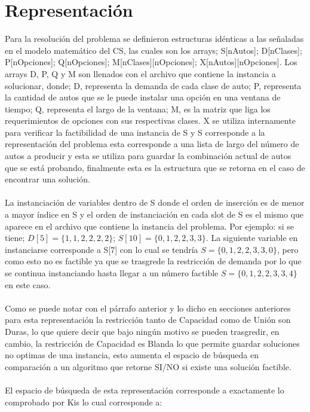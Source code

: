 \documentclass[letter, 10pt]{article}
\begin{document}
\section{Representaci\'on}
Para la resoluci\'on del problema se definieron estructuras id\'enticas a las se\~{n}aladas en el modelo matem\'atico del CS, las cuales son los arrays; S[nAutos]; D[nClases]; P[nOpciones]; Q[nOpciones]; M[nClases][nOpciones]; X[nAutos][nOpciones]. Los arrays D, P, Q y M son llenados con el archivo que contiene la instancia a solucionar, donde; D, representa la demanda de cada clase de auto; P, representa la cantidad de autos que se le puede instalar una opci\'on en una ventana de tiempo; Q, representa el largo de la ventana; M, es la matriz que liga los requerimientos de opciones con sus respectivas clases. X se utiliza internamente para verificar la factibilidad de una instancia de S y S corresponde a la representaci\'on del problema esta corresponde a una lista de largo del n\'umero de autos a producir y esta se utiliza para guardar la combinaci\'on actual de autos que se est\'a probando, finalmente esta es la estructura que se retorna en el caso de encontrar una soluci\'on.\\\\
La instanciaci\'on de variables dentro de S donde el orden de inserci\'on es de menor a mayor \'indice en S y el orden de instanciaci\'on en cada slot de S es el mismo que aparece en el archivo que contiene la instancia del problema. Por ejemplo: si se tiene; $D[5] = \{1, 1, 2, 2, 2, 2\}$; $S[10] = \{0, 1, 2, 2, 3, 3\}$. La siguiente variable en instanciarse corresponde a S[7] con lo cual se tendr\'ia $S = \{0, 1, 2, 2, 3, 3, 0\}$, pero como esto no es factible ya que se trasgrede la restricci\'on de demanda por lo que se continua instanciando hasta llegar a un n\'umero factible $S = \{0, 1, 2, 2, 3, 3, 4\}$ en este caso.\\\\
Como se puede notar con el p\'arrafo anterior y lo dicho en secciones anteriores para esta representaci\'on la restricci\'on tanto de Capacidad como de Uni\'on son Duras, lo que quiere decir que bajo ning\'un motivo se pueden trasgredir, en cambio, la restricci\'on de Capacidad es Blanda lo que permite guardar soluciones no optimas de una instancia, esto aumenta el espacio de b\'usqueda en comparaci\'on a un algoritmo que retorne SI/NO si existe una soluci\'on factible.\\\\
El espacio de b\'usqueda de esta representaci\'on corresponde a exactamente lo comprobado por Kis \cite{Tamas} lo cual corresponde a:
\end{document}
